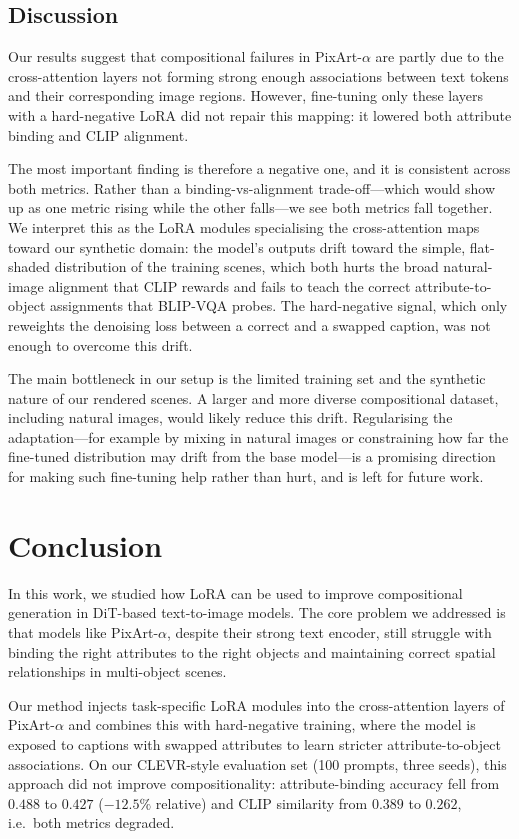 \documentclass[12pt,onecolumn]{IEEEtran}
\begin{document}
\subsection{Discussion}
Our results suggest that compositional failures in PixArt-$\alpha$ are partly
due to the cross-attention layers not forming strong enough associations between
text tokens and their corresponding image regions. However, fine-tuning only
these layers with a hard-negative LoRA did not repair this mapping: it lowered
both attribute binding and CLIP alignment.

The most important finding is therefore a negative one, and it is consistent
across both metrics. Rather than a binding-vs-alignment trade-off---which would
show up as one metric rising while the other falls---we see both metrics fall
together. We interpret this as the LoRA modules specialising the cross-attention
maps toward our synthetic domain: the model's outputs drift toward the simple,
flat-shaded distribution of the training scenes, which both hurts the broad
natural-image alignment that CLIP rewards and fails to teach the correct
attribute-to-object assignments that BLIP-VQA probes. The hard-negative signal,
which only reweights the denoising loss between a correct and a swapped caption,
was not enough to overcome this drift.

The main bottleneck in our setup is the limited training set and the
synthetic nature of our rendered scenes. A larger and more diverse
compositional dataset, including natural images, would likely reduce this drift.
Regularising the adaptation---for example by mixing in natural images or
constraining how far the fine-tuned distribution may drift from the base
model---is a promising direction for making such fine-tuning help rather than
hurt, and is left for future work.

\section{Conclusion}
In this work, we studied how LoRA can be used to improve compositional 
generation in DiT-based text-to-image models. The core problem we addressed 
is that models like PixArt-$\alpha$, despite their strong text encoder,
still struggle with binding the right attributes to the right objects and 
maintaining correct spatial relationships in multi-object scenes.

Our method injects task-specific LoRA modules into the cross-attention
layers of PixArt-$\alpha$ and combines this with hard-negative training,
where the model is exposed to captions with swapped attributes to learn
stricter attribute-to-object associations. On our CLEVR-style evaluation set
(100 prompts, three seeds), this approach did not improve compositionality:
attribute-binding accuracy fell from $0.488$ to $0.427$ ($-12.5\%$ relative)
and CLIP similarity from $0.389$ to $0.262$, i.e.\ both metrics degraded.
\end{document}
